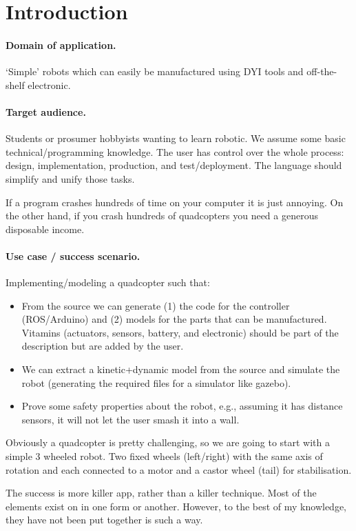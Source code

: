 \section{Introduction}
\label{sec:intro}

\paragraph{Domain of application.}
`Simple' robots which can easily be manufactured using DYI tools and off-the-shelf electronic.

\paragraph{Target audience.}
Students or prosumer hobbyists wanting to learn robotic.
We assume some basic technical/programming knowledge.
The user has control over the whole process: design, implementation, production, and test/deployment.
The language should simplify and unify those tasks.

If a program crashes hundreds of time on your computer it is just annoying.
On the other hand, if you crash hundreds of quadcopters you need a generous disposable income.

\paragraph{Use case / success scenario.}
Implementing/modeling a quadcopter such that:
\begin{itemize}
\item From the source we can generate (1) the code for the controller (ROS/Arduino) and (2) models for the parts that can be manufactured.
Vitamins (actuators, sensors, battery, and electronic) should be part of the description but are added by the user.
\item We can extract a kinetic+dynamic model from the source and simulate the robot (generating the required files for a simulator like gazebo).
\item Prove some safety properties about the robot, e.g., assuming it has distance sensors, it will not let the user smash it into a wall.
\end{itemize}
Obviously a quadcopter is pretty challenging, so we are going to start with a simple 3 wheeled robot.
Two fixed wheels (left/right) with the same axis of rotation and each connected to a motor and a castor wheel (tail) for stabilisation.

The success is more killer app, rather than a killer technique.
Most of the elements exist on in one form or another.
However, to the best of my knowledge, they have not been put together is such a way.

